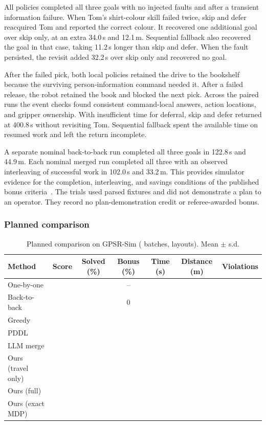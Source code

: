 \documentclass[conference]{IEEEtran}
\newcommand{\X}{}
\newcommand{\X}{\textcolor{red}{XX}}
\begin{document}
All policies completed all three goals with no injected faults and after a
transient information failure. When Tom's shirt-colour skill failed twice,
skip and defer reacquired Tom and reported the correct colour. It recovered
one additional goal over skip only, at an extra 34.0\,s and 12.1\,m.
Sequential fallback also recovered the goal in that case, taking 11.2\,s
longer than skip and defer. When the fault persisted, the revisit added
32.2\,s over skip only and recovered no goal.

After the failed pick, both local policies retained the drive to the
bookshelf because the surviving person-information command needed it.
After a failed release, the robot retained the book and blocked the next
pick. Across the paired runs the event checks found consistent command-local
answers, action locations, and gripper ownership. With insufficient time for
deferral, skip and defer returned at 400.8\,s without revisiting Tom.
Sequential fallback spent the available time on resumed work and left the
return incomplete.

A separate nominal back-to-back run completed all three goals in 122.8\,s
and 44.9\,m. Each nominal merged run completed all three with an observed
interleaving of successful work in 102.0\,s and 33.2\,m. This provides
simulator evidence for the completion, interleaving, and savings conditions
of the published bonus criteria~\cite{rulebook}. The trials used parsed
fixtures and did not demonstrate a plan to an operator. They record no
plan-demonstration credit or referee-awarded bonus.

\subsubsection{Planned comparison}
\begin{table}[t]
\centering
\caption{Planned comparison on GPSR-Sim (\X{} batches, \X{} layouts). Mean $\pm$ s.d.}
\label{tab:main}
\begin{tabular}{lcccccc}
\toprule
Method & Score & Solved (\%) & Bonus (\%) & Time (s) & Distance (m) & Violations \\
\midrule
One-by-one       & \X & \X & --  & \X & \X & \X \\
Back-to-back     & \X & \X & 0   & \X & \X & \X \\
Greedy           & \X & \X & \X  & \X & \X & \X \\
PDDL             & \X & \X & \X  & \X & \X & \X \\
LLM merge        & \X & \X & \X  & \X & \X & \X \\
Ours (travel only) & \X & \X & \X & \X & \X & \X \\
Ours (full)      & \X & \X & \X  & \X & \X & \X \\
Ours (exact MDP) & \X & \X & \X  & \X & \X & \X \\
\bottomrule
\end{tabular}
\end{table}
\end{document}
